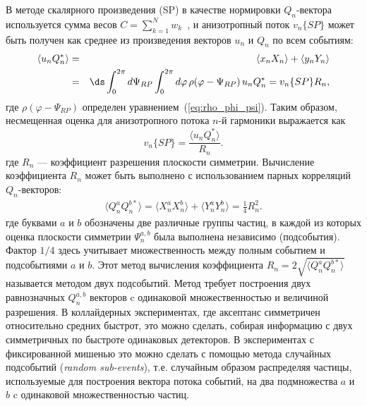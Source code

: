 В методе скалярного произведения (SP) в качестве  нормировки  $Q_n$-вектора используется сумма весов $C=\sum_{k=1}^N w_k$~\cite{Mamaev:2020lpi}, и анизотропный поток  $v_n\{SP\}$  может быть получен как среднее из  произведения векторов $u_n$ и $Q_n$ по всем событиям:
\begin{eqnarray}
\label{meanDefin}
 \langle u_n Q_n^* \rangle &=& \langle x_n X_n \rangle  + \langle y_n Y_n \rangle
\\
&=& 
\nonumber
\ds \int_{0}^{2\pi} d \Psi_{RP} \int_{0}^{2\pi} d \varphi \, \rho( \varphi - \Psi_{RP} ) \,
u_n Q_n^* = v_n\{SP\} R_n,
\end{eqnarray}
где $\rho( \varphi - \Psi_{RP} )$ определен уравнением~(\ref{eq:rho_phi_psi}).
Таким образом, несмещенная оценка для анизотропного потока $n$-й гармоники выражается как
\begin{equation}
  \label{sproduct}
    v_n\{SP\} =  \frac{\langle u_n Q_n^* \rangle }{R_n}.
\end{equation}
где $R_n$ --- коэффициент разрешения плоскости симметрии.
Вычисление коэффициента  $R_n$ может быть выполнено с использованием парных корреляций $Q_n$-векторов:
\begin{eqnarray}
\label{resolution}
\langle Q_n^a Q_n^{b*} \rangle = \langle X_n^a X_n^b \rangle + \langle Y_n^a Y_n^b \rangle = \frac{1}{4} R_n^2.
\end{eqnarray}
где буквами $a$ и $b$ обозначены две различные группы частиц, в каждой из которых оценка
плоскости симметрии $\Psi_n^{a,b}$ была выполнена независимо (подсобытия).
Фактор $1/4$ здесь учитывает множественность между полным событием и подсобытиями $a$ и $b$.
Этот метод вычисления  коэффициента  $R_n = 2 \sqrt{ \langle Q_{n}^{a}Q_{n}^{b*} \rangle }$  называется методом двух подсобытий.
Метод  требует построения двух равнозначных
$Q_{n}^{a,b}$ векторов c одинаковой множественностью и величиной разрешения. 
В коллайдерных экспериментах, где аксептанс симметричен относительно средних быстрот, это можно сделать, собирая
информацию с двух симметричных по быстроте одинаковых детекторов.
В экспериментах с фиксированной мишенью это можно сделать с помощью метода
случайных подсобытий ({\em random sub-events}),
т.е. случайным образом распределяя частицы, используемые для построения вектора потока событий,
на два подмножества $a$ и $b$ c одинаковой множественностью частиц.

